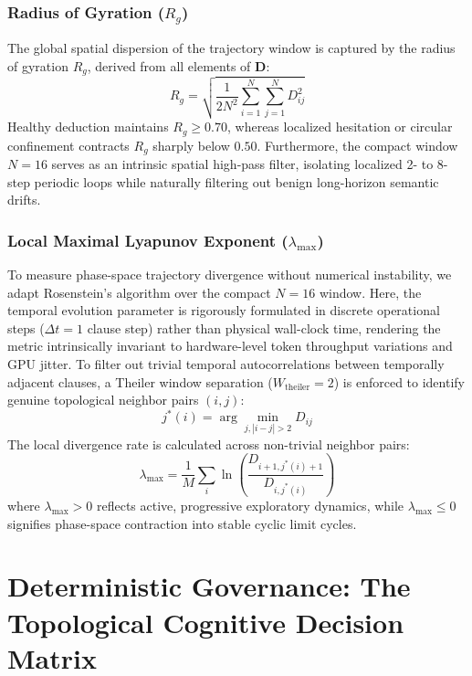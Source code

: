 \documentclass[11pt,a4paper]{article}
\begin{document}
\subsubsection{\texorpdfstring{Radius of Gyration ($R_g$)}{Radius of Gyration (Rg)}}
The global spatial dispersion of the trajectory window is captured by the radius of gyration $R_g$, derived from all elements of $\mathbf{D}$:
\begin{equation}
R_g = \sqrt{\frac{1}{2N^2} \sum_{i=1}^N \sum_{j=1}^N D_{ij}^2}
\end{equation}
Healthy deduction maintains $R_g \ge 0.70$, whereas localized hesitation or circular confinement contracts $R_g$ sharply below $0.50$. Furthermore, the compact window $N=16$ serves as an intrinsic spatial high-pass filter, isolating localized 2- to 8-step periodic loops while naturally filtering out benign long-horizon semantic drifts.

\subsubsection{\texorpdfstring{Local Maximal Lyapunov Exponent ($\lambda_{\max}$)}{Local Maximal Lyapunov Exponent (lambda\_max)}}
To measure phase-space trajectory divergence without numerical instability, we adapt Rosenstein's algorithm \cite{rosenstein1993practical} over the compact $N=16$ window. Here, the temporal evolution parameter is rigorously formulated in discrete operational steps ($\Delta t = 1$ clause step) rather than physical wall-clock time, rendering the metric intrinsically invariant to hardware-level token throughput variations and GPU jitter. To filter out trivial temporal autocorrelations between temporally adjacent clauses, a Theiler window separation ($W_{\mathrm{theiler}} = 2$) is enforced to identify genuine topological neighbor pairs $(i, j)$:
\begin{equation}
j^*(i) = \arg\min_{j, |i-j| > 2} D_{ij}
\end{equation}
The local divergence rate is calculated across non-trivial neighbor pairs:
\begin{equation}
\lambda_{\max} = \frac{1}{M} \sum_{i} \ln \left( \frac{D_{i+1, j^*(i)+1}}{D_{i, j^*(i)}} \right)
\end{equation}
where $\lambda_{\max} > 0$ reflects active, progressive exploratory dynamics, while $\lambda_{\max} \le 0$ signifies phase-space contraction into stable cyclic limit cycles.

\section{Deterministic Governance: The Topological Cognitive Decision Matrix}
\end{document}
